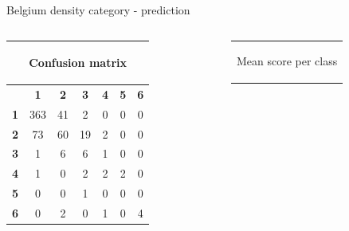 \documentclass[c]{beamer}
\begin{document}
\begin{frame}
\begin{columns}
\begin{column}{0.5\textwidth}
\begin{overlayarea}{\linewidth}{4cm}
  \end{overlayarea}
  \begin{overlayarea}{\linewidth}{0.5cm}
    \centering
    \tiny Belgium density category - prediction\par
  \end{overlayarea}
 \end{column}
\end{columns}
\begin{columns}
 \begin{column}{0.5\textwidth}
 \begin{overlayarea}{\linewidth}{2cm}
  \begin{table}
  \begin{center}
  \begin{adjustbox}{max width=0.7\textwidth}
  {\tiny
  \begin{tabular}{|c|c|c|c|c|c|c|}
    \hline
    \multicolumn{7}{|c|}{{\tiny \begin{bf}Confusion matrix\end{bf}}} \\
    \hline
     & \textbf{1} & \textbf{2} & \textbf{3} & \textbf{4} & \textbf{5} & \textbf{6}\\
    \hline
    \textbf{1} & 363 & 41 & 2 & 0 & 0 & 0\\
    \hline
    \textbf{2} & 73 & 60 & 19 & 2 & 0 & 0\\
    \hline
    \textbf{3} & 1 & 6 & 6 & 1 & 0 & 0\\
    \hline
    \textbf{4} & 1 & 0 & 2 & 2 & 2 & 0\\
    \hline
    \textbf{5} & 0 & 0 & 1 & 0 & 0 & 0\\
    \hline
    \textbf{6} & 0 & 2 & 0 & 1 & 0 & 4\\
    \hline
  \end{tabular}
  }
  \end{adjustbox}
  \end{center}
  \end{table}
 \end{overlayarea}
 \end{column}
 \begin{column}{0.5\textwidth}
 \begin{overlayarea}{\linewidth}{2cm}
  \begin{table}
    \begin{center}
    \begin{adjustbox}{max width=0.4\textwidth}
    {\tiny 
    \begin{tabular}{|c|c|}
      \hline
      \multicolumn{2}{|c|}{\begin{bf}Mean score per class\end{bf}} \\

\end{tabular}}
\end{adjustbox}
\end{center}
\end{table}
\end{overlayarea}
\end{column}
\end{columns}
\end{frame}
\end{document}
